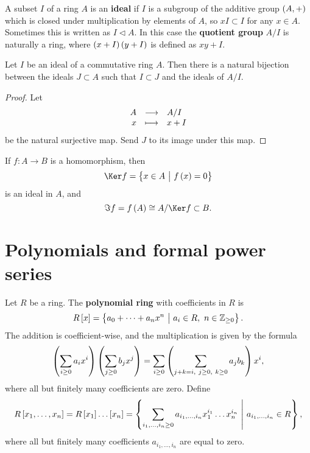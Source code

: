 \begin{definition}
A subset $ I $ of a ring $ A $ is an \textbf{ideal} if $ I $ is a subgroup of the additive group $ \br{A, +} $ which is closed under multiplication by elements of $ A $, so $ xI \subset I $ for any $ x \in A $. Sometimes this is written as $ I \triangleleft A $. In this case the \textbf{quotient group} $ A / I $ is naturally a ring, where $ \br{x + I}\br{y + I} $ is defined as $ xy + I $.
\end{definition}

\begin{proposition}
Let $ I $ be an ideal of a commutative ring $ A $. Then there is a natural bijection between the ideals $ J \subset A $ such that $ I \subset J $ and the ideals of $ A / I $.
\end{proposition}

\begin{proof}
Let
$$ \function{A}{A / I}{x}{x + I} $$
be the natural surjective map. Send $ J $ to its image under this map.
\end{proof}

\begin{definition}
If $ f : A \to B $ is a homomorphism, then
$$ \Ker f = \cbr{x \in A \st f\br{x} = 0} $$
is an ideal in $ A $, and
$$ \Im f = f\br{A} \cong A / \Ker f \subset B. $$
\end{definition}

\pagebreak

\section{Polynomials and formal power series}


\begin{definition}
Let $ R $ be a ring. The \textbf{polynomial ring} with coefficients in $ R $ is
$$ R\sbr{x} = \cbr{a_0 + \dots + a_nx^n \st a_i \in R, \ n \in \ZZ_{\ge 0}}. $$
The addition is coefficient-wise, and the multiplication is given by the formula
$$ \br{\sum_{i \ge 0} a_ix^i}\br{\sum_{j \ge 0} b_jx^j} = \sum_{i \ge 0} \br{\sum_{j + k = i, \ j \ge 0, \ k \ge 0} a_jb_k}x^i, $$
where all but finitely many coefficients are zero. Define
$$ R\sbr{x_1, \dots, x_n} = R\sbr{x_1} \dots \sbr{x_n} = \cbr{\sum_{i_1, \dots, i_n \ge 0} a_{i_1, \dots, i_n}x_1^{i_1} \dots x_n^{i_n} \st a_{i_1, \dots, i_n} \in R}, $$
where all but finitely many coefficients $ a_{i_1, \dots, i_n} $ are equal to zero.
\end{definition}


